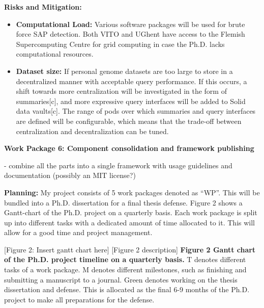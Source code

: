 \documentclass[11pt]{article}
\begin{document}
\textbf{Risks and Mitigation:} 
\begin{itemize}
	\item \textbf{Computational Load:} Various software packages will be used for brute force SAP detection. 
	Both VITO and UGhent have access to the Flemish Supercomputing Centre for grid computing in case the Ph.D. lacks computational resources. 
	\item \textbf{Dataset size:} If personal genome datasets are too large to store in a decentralized manner with acceptable query performance. 
	If this occurs, a shift towards more centralization will be investigated in the form of summaries[c], and more expressive query interfaces will be added to Solid data vaults[c]. 
	The range of pods over which summaries and query interfaces are defined will be configurable, which means that the trade-off between centralization and decentralization can be tuned.
\end{itemize}


\textbf{Work Package 6: Component consolidation and framework publishing}

- combine all the parts into a single framework with usage guidelines and documentation (possibly an MIT license?)



\textbf{Planning:}
My project consists of 5 work packages denoted as “WP”. 
This will be bundled into a Ph.D. dissertation for a final thesis defense. Figure 2 shows a Gantt-chart of the Ph.D. project on a quarterly basis.  
Each work package is split up into different tasks with a dedicated amount of time allocated to it. 
This will allow for a good time and project management. 

[Figure 2: Insert gantt chart here]
[Figure 2 description]
\textbf{Figure 2 Gantt chart of the Ph.D. project timeline on a quarterly basis.} T denotes different tasks of a work package. M denotes different milestones, such as finishing and submitting a manuscript to a journal. 
Green denotes working on the thesis dissertation and defense. 
This is allocated as the final 6-9 months of the Ph.D. project to make all preparations for the defense. 
\end{document}
